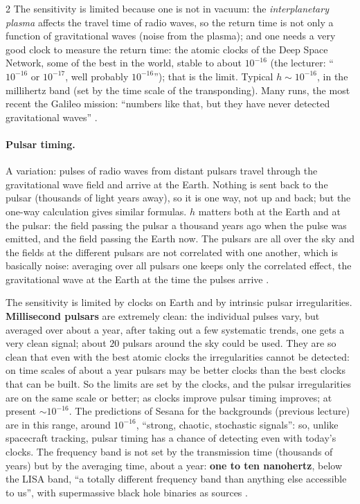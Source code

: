 \begin{paracol}{2}
The sensitivity is limited because one is not in vacuum: the \emph{interplanetary plasma} affects the travel time of radio waves, so the return time is not only a function of gravitational waves (noise from the plasma); and one needs a very good clock to measure the return time: the atomic clocks of the Deep Space Network, some of the best in the world, stable to about $10^{-16}$ (the lecturer: ``$10^{-16}$ or $10^{-17}$, well probably $10^{-16}$''); that is the limit. Typical $h\sim10^{-16}$, in the millihertz band (set by the time scale of the transponding). Many runs, the most recent the Galileo mission: ``numbers like that, but they have never detected gravitational waves'' .

\paragraph{Pulsar timing.} A variation: pulses of radio waves from distant pulsars travel through the gravitational wave field and arrive at the Earth. Nothing is sent back to the pulsar (thousands of light years away), so it is one way, not up and back; but the one-way calculation gives similar formulas. $h$ matters both at the Earth and at the pulsar: the field passing the pulsar a thousand years ago when the pulse was emitted, and the field passing the Earth now. The pulsars are all over the sky and the fields at the different pulsars are not correlated with one another, which is basically noise: averaging over all pulsars one keeps only the correlated effect, the gravitational wave at the Earth at the time the pulses arrive .

The sensitivity is limited by clocks on Earth and by intrinsic pulsar irregularities. \textbf{Millisecond pulsars} are extremely clean: the individual pulses vary, but averaged over about a year, after taking out a few systematic trends, one gets a very clean signal; about $20$ pulsars around the sky could be used. They are so clean that even with the best atomic clocks the irregularities cannot be detected: on time scales of about a year pulsars may be better clocks than the best clocks that can be built. So the limits are set by the clocks, and the pulsar irregularities are on the same scale or better; as clocks improve pulsar timing improves; at present $\sim10^{-16}$. The predictions of Sesana for the backgrounds (previous lecture) are in this range, around $10^{-16}$, ``strong, chaotic, stochastic signals'': so, unlike spacecraft tracking, pulsar timing has a chance of detecting even with today's clocks. The frequency band is not set by the transmission time (thousands of years) but by the averaging time, about a year: \textbf{one to ten nanohertz}, below the LISA band, ``a totally different frequency band than anything else accessible to us'', with supermassive black hole binaries as sources .


\end{paracol}
